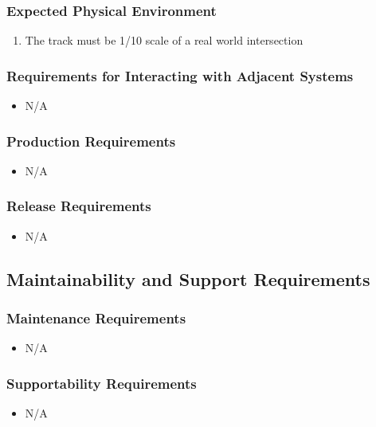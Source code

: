 \documentclass [12pt]{article}
\begin{document}
\subsubsection{Expected Physical Environment }
	\begin{enumerate}[label=\textbf{\Alph*}:]
		\item The track must be 1/10 scale of a real world intersection
	\end{enumerate}
		
\subsubsection{Requirements for Interacting with Adjacent Systems}
	\begin{itemize}
		\item N/A
	\end{itemize}

\subsubsection{Production Requirements}
	\begin{itemize}
		\item N/A
	\end{itemize} 

\subsubsection{Release Requirements}
	\begin{itemize}
		\item N/A
	\end{itemize}		

\subsection{\large Maintainability and Support Requirements }
\subsubsection{Maintenance Requirements }
	\begin{itemize}
		\item N/A
	\end{itemize}

\subsubsection{Supportability Requirements }
	\begin{itemize}
		\item N/A
	\end{itemize}
\end{document}
